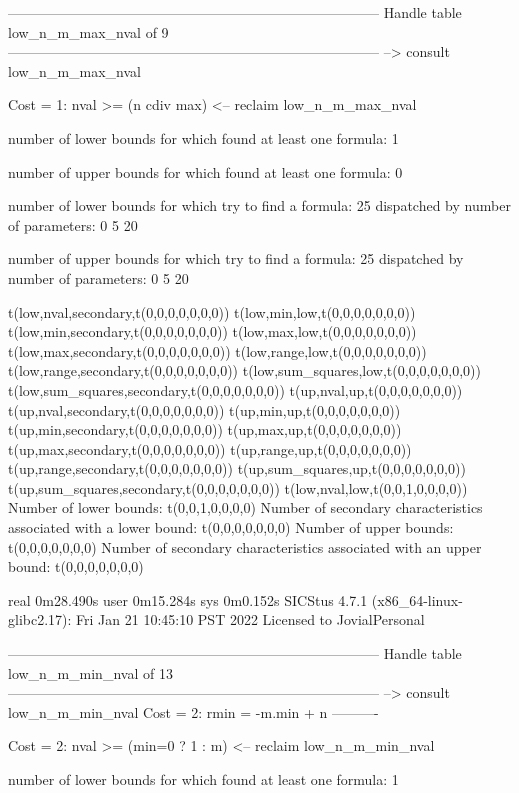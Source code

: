 --------------------------------------------------------------------------------
Handle table low_n_m_max_nval of 9
--------------------------------------------------------------------------------
--> consult low_n_m_max_nval

Cost =  1:  nval >= (n cdiv max)
<-- reclaim low_n_m_max_nval

number of lower bounds for which found at least one formula: 1

number of upper bounds for which found at least one formula: 0

number of lower bounds for which try to find a formula: 25
dispatched by number of parameters: 0  5  20

number of upper bounds for which try to find a formula: 25
dispatched by number of parameters: 0  5  20

t(low,nval,secondary,t(0,0,0,0,0,0,0))
t(low,min,low,t(0,0,0,0,0,0,0))
t(low,min,secondary,t(0,0,0,0,0,0,0))
t(low,max,low,t(0,0,0,0,0,0,0))
t(low,max,secondary,t(0,0,0,0,0,0,0))
t(low,range,low,t(0,0,0,0,0,0,0))
t(low,range,secondary,t(0,0,0,0,0,0,0))
t(low,sum_squares,low,t(0,0,0,0,0,0,0))
t(low,sum_squares,secondary,t(0,0,0,0,0,0,0))
t(up,nval,up,t(0,0,0,0,0,0,0))
t(up,nval,secondary,t(0,0,0,0,0,0,0))
t(up,min,up,t(0,0,0,0,0,0,0))
t(up,min,secondary,t(0,0,0,0,0,0,0))
t(up,max,up,t(0,0,0,0,0,0,0))
t(up,max,secondary,t(0,0,0,0,0,0,0))
t(up,range,up,t(0,0,0,0,0,0,0))
t(up,range,secondary,t(0,0,0,0,0,0,0))
t(up,sum_squares,up,t(0,0,0,0,0,0,0))
t(up,sum_squares,secondary,t(0,0,0,0,0,0,0))
t(low,nval,low,t(0,0,1,0,0,0,0))
Number of lower bounds:                                             t(0,0,1,0,0,0,0)
Number of secondary characteristics associated with a lower bound:  t(0,0,0,0,0,0,0)
Number of upper bounds:                                             t(0,0,0,0,0,0,0)
Number of secondary characteristics associated with an upper bound: t(0,0,0,0,0,0,0)

real	0m28.490s
user	0m15.284s
sys	0m0.152s
SICStus 4.7.1 (x86_64-linux-glibc2.17): Fri Jan 21 10:45:10 PST 2022
Licensed to JovialPersonal


--------------------------------------------------------------------------------
Handle table low_n_m_min_nval of 13
--------------------------------------------------------------------------------
--> consult low_n_m_min_nval
Cost =  2:  rmin = -m.min + n
----------

Cost =  2:  nval >= (min=0 ? 1 : m)
<-- reclaim low_n_m_min_nval

number of lower bounds for which found at least one formula: 1

